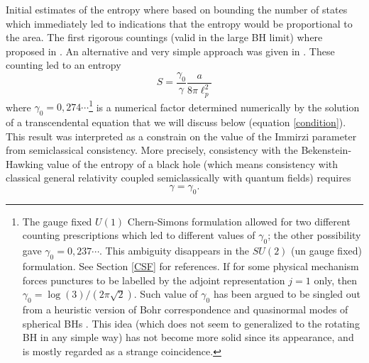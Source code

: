 \documentclass[aps, nofootinbib,superscriptaddress,12pt]{revtex4-2}
\def\be{\begin{equation}}
\def\ee{\end{equation}}
\begin{document}
Initial estimates of the entropy where based on bounding the number of states \cite{Rovelli:1996dv, Krasnov:1996wc, Ashtekar:1997yu} which immediately led to indications that the entropy would be proportional to the area. The first rigorous countings (valid in the large BH limit) where proposed in \cite{Domagala:2004jt, Meissner:2004ju}. An alternative and very simple approach was given in 
\cite{Ghosh:2006ph}. These counting led to an entropy 
\be\label{liner}
S=\frac{\gamma_0}{\gamma} \frac{a}{8\pi \ell_p^2}
\ee
where $\gamma_0=0,274\cdots$\footnote{The gauge fixed $U(1)$ Chern-Simons formulation allowed for two different counting prescriptions which led to different values of $\gamma_0$; the other possibility gave $\gamma_0=0,237\cdots$. This ambiguity disappears in the $SU(2)$ (un gauge fixed) formulation. See Section \ref{CSF} for references. If for some physical mechanism \cite{Dreyer:2004jy} forces punctures to be labelled by the adjoint representation $j=1$ only, then $\gamma_0=\log(3)/(2\pi \sqrt{2})$. Such value of $\gamma_0$ has been argued to be singled out from a heuristic version of Bohr correspondence and quasinormal modes of spherical BHs \cite{Dreyer:2002vy}. This idea (which does not seem to generalized to the rotating BH in any simple way) has not become more solid since its appearance, and is mostly regarded as a strange coincidence.} is a numerical factor determined numerically by the solution of a transcendental equation
that we will discuss below (equation \eqref{condition}). This result was interpreted as a constrain on the value of the Immirzi parameter from semiclassical consistency. More precisely, consistency with the Bekenstein-Hawking value of the entropy of a black hole (which means consistency with classical general relativity coupled semiclassically with quantum fields) requires 
\be\label{gnot}
\gamma=\gamma_0.
\ee
\end{document}
